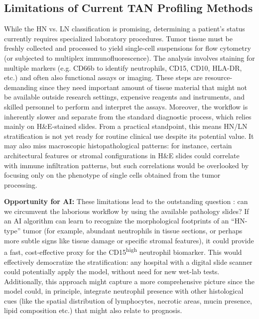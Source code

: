 \subsection{Limitations of Current TAN Profiling Methods}
\label{sec:limitations}
While the HN vs. LN classification is promising, determining a patient's status currently requires specialized laboratory procedures. Tumor tissue must be freshly collected and processed to yield single-cell suspensions for flow cytometry (or subjected to multiplex immunofluorescence). The analysis involves staining for multiple markers (e.g. CD66b to identify neutrophils, CD15, CD10, HLA-DR, etc.) \cite{manzo2022} and often also functional assays or imaging. These steps are resource-demanding since they need important amount of tissue material that might not be available outside research settings, expensive reagents and instruments, and skilled personnel to perform and interpret the assays. Moreover, the workflow is inherently slower and separate from the standard diagnostic process, which relies mainly on H\&E-stained slides. From a practical standpoint, this means HN/LN stratification is not yet ready for routine clinical use despite its potential value. It may also miss macroscopic histopathological patterns: for instance, certain architectural features or stromal configurations in H\&E slides could correlate with immune infiltration patterns, but such correlations would be overlooked by focusing only on the phenotype of single cells obtained from the tumor processing.

\textbf{Opportunity for AI:} These limitations lead to the outstanding question : can we circumvent the laborious workflow by using the available pathology slides? If an AI algorithm can learn to recognize the morphological footprints of an ``HN-type'' tumor (for example, abundant neutrophils in tissue sections, or perhaps more subtle signs like tissue damage or specific stromal features), it could provide a fast, cost-effective proxy for the CD15\textsuperscript{high} neutrophil biomarker. This would effectively democratize the stratification: any hospital with a digital slide scanner could potentially apply the model, without need for new wet-lab tests. Additionally, this approach might capture a more comprehensive picture since the model could, in principle, integrate neutrophil presence with other histological cues (like the spatial distribution of lymphocytes, necrotic areas, mucin presence, lipid composition etc.) that might also relate to prognosis.

